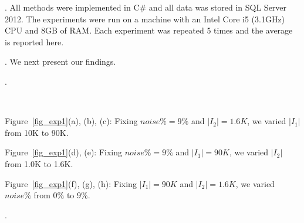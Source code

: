 . All methods were implemented in C\# and all data was stored in SQL Server 2012. The experiments were run on a machine with an Intel Core i5 (3.1GHz) CPU and 8GB of RAM. Each experiment was repeated 5 times and the average is reported here.

. We next present our findings.

.

\begin{figure*}
  \centering
   \\
  \caption{Efficiency of detecting \pCFD and \pCIND violations}\label{fig_exp1}
\end{figure*}

Figure~\ref{fig_exp1}(a), (b), (c): Fixing $noise\% = 9\%$ and $|I_2| = 1.6K$, we varied $|I_1|$ from 10K to 90K.

Figure~\ref{fig_exp1}(d), (e): Fixing $noise\% = 9\%$ and $|I_1| = 90K$, we varied $|I_2|$ from 1.0K to 1.6K.

Figure~\ref{fig_exp1}(f), (g), (h): Fixing $|I_1| = 90K$ and $|I_2| = 1.6K$, we varied $noise\%$ from 0\% to 9\%.


.

\begin{figure*}
  \centering
   \\
  \caption{Effectiveness of detecting \pCFD and \pCIND violations}\label{fig_exp2}
\end{figure*}

